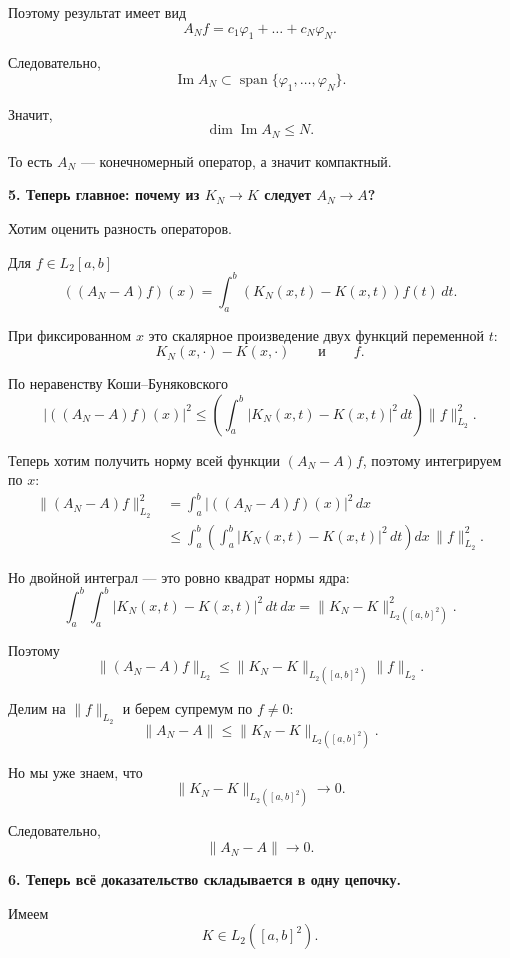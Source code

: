 \begin{idea}
	Поэтому результат имеет вид
	\[
	A_Nf
	=
	c_1\varphi_1+\ldots+c_N\varphi_N.
	\]
	
	Следовательно,
	\[
	\boxed{
		\operatorname{Im}A_N
		\subset
		\operatorname{span}\{\varphi_1,\ldots,\varphi_N\}.
	}
	\]
	
	Значит,
	\[
	\dim\operatorname{Im}A_N\leq N.
	\]
	
	То есть \(A_N\) --- конечномерный оператор, а значит компактный.
	
	\medskip
	
	\textbf{5. Теперь главное: почему из \(K_N\to K\) следует \(A_N\to A\)?}
	
	Хотим оценить разность операторов.
	
	Для \(f\in L_2[a,b]\)
	\[
	((A_N-A)f)(x)
	=
	\int_a^b
	(K_N(x,t)-K(x,t))f(t)\,dt.
	\]
	
	При фиксированном \(x\) это скалярное произведение двух функций
	переменной \(t\):
	\[
	K_N(x,\cdot)-K(x,\cdot)
	\qquad\text{и}\qquad
	f.
	\]
	
	По неравенству Коши--Буняковского
	\[
	\left|
	((A_N-A)f)(x)
	\right|^2
	\leq
	\left(
	\int_a^b
	|K_N(x,t)-K(x,t)|^2\,dt
	\right)
	\|f\|_{L_2}^2.
	\]
	
	Теперь хотим получить норму всей функции \((A_N-A)f\),
	поэтому интегрируем по \(x\):
	\[
	\begin{aligned}
		\|(A_N-A)f\|_{L_2}^2
		&=
		\int_a^b
		|((A_N-A)f)(x)|^2\,dx
		\\
		&\leq
		\int_a^b
		\left(
		\int_a^b
		|K_N(x,t)-K(x,t)|^2\,dt
		\right)dx
		\,
		\|f\|_{L_2}^2.
	\end{aligned}
	\]
	
	Но двойной интеграл --- это ровно квадрат нормы ядра:
	\[
	\int_a^b\int_a^b
	|K_N(x,t)-K(x,t)|^2\,dt\,dx
	=
	\|K_N-K\|_{L_2([a,b]^2)}^2.
	\]
	
	Поэтому
	\[
	\|(A_N-A)f\|_{L_2}
	\leq
	\|K_N-K\|_{L_2([a,b]^2)}
	\|f\|_{L_2}.
	\]
	
	Делим на \(\|f\|_{L_2}\) и берем супремум по \(f\neq0\):
	\[
	\boxed{
		\|A_N-A\|
		\leq
		\|K_N-K\|_{L_2([a,b]^2)}.
	}
	\]
	
	Но мы уже знаем, что
	\[
	\|K_N-K\|_{L_2([a,b]^2)}\to0.
	\]
	
	Следовательно,
	\[
	\boxed{
		\|A_N-A\|\to0.
	}
	\]
	
	\medskip
	
	\textbf{6. Теперь всё доказательство складывается в одну цепочку.}
	
	Имеем
	\[
	K\in L_2([a,b]^2).
	\]
	

\end{idea}
